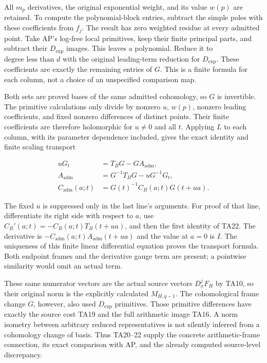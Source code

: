 All \(m_p\) derivatives, the original exponential weight, and its value \(w(p)\)
are retained. To compute the polynomial-block entries, subtract the simple
poles with these coefficients from \(f_j\). The result has zero weighted
residue at every admitted point. Take AP's log-free local primitives,
keep their finite principal parts, and subtract their \(D_{\mathrm{exp}}\) images. This
leaves a polynomial. Reduce it to \(\text{degree less than }d\) with the original
leading-term reduction for \(D_{\mathrm{exp}}\). These coefficients are exactly the
remaining entries of \(G\). This is a finite formula for each column, not a
choice of an unspecified comparison map.

Both sets are proved bases of the same admitted cohomology, so \(G\) is
invertible. The primitive calculations only divide by nonzero \(u\), \(w(p)\),
nonzero leading coefficients, and fixed nonzero differences of distinct
points. Their finite coefficients are therefore holomorphic for \(u\ne0\) and
all \(t\). Applying \(L\) to each column, with its parameter dependence included,
gives the exact identity and finite scaling transport

\[
\begin{aligned}uG_t&=T_BG-GA_{\mathrm{adm}},\\A_{\mathrm{adm}}&=G^{-1}T_BG-uG^{-1}G_t,\\C_{\mathrm{adm}}(a;t)&=G(t)^{-1}C_B(a;t)G(t+ua).\end{aligned}\tag{TA22}
\]

The fixed \(u\) is suppressed only in the last line's arguments. For proof of
that line, differentiate its right side with \(\text{respect to }a\), use
\(C_B'(a;t)=-C_B(a;t)T_B(t+ua)\), and then the first identity of TA22.
The derivative is \(-C_{\mathrm{adm}}(a;t)A_{\mathrm{adm}}(t+ua)\) and the value at \(a=0\) is \(I\).
The uniqueness of this finite linear differential equation proves the
transport formula. Both endpoint frames and the derivative gauge term
are present; a pointwise similarity would omit an actual term.

These same numerator vectors are the actual source vectors \(D_x^jF_H\)
by TA10, so their original norm is the explicitly calculated \(M_{H,q-1}\).
The cohomological frame change \(G\), however, also used \(D_{\mathrm{exp}}\) primitives.
Those primitive differences have exactly the source cost TA19 and the
full arithmetic image TA16. A norm isometry between arbitrary reduced
representatives is not silently inferred from a cohomology change of basis.
Thus TA20--22 supply the concrete arithmetic-frame connection, its exact
comparison with AP, and the already computed source-level discrepancy.

